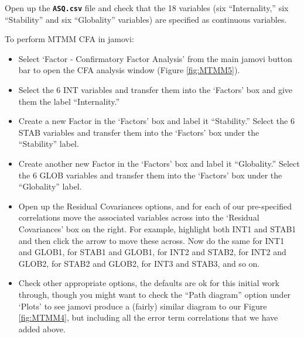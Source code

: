 \documentclass[
]{book}
\providecommand{\tightlist}{%
  \setlength{\itemsep}{0pt}\setlength{\parskip}{0pt}}
\begin{document}
Open up the \textbf{\texttt{ASQ.csv}} file and check that the 18 variables (six ``Internality,'' six ``Stability'' and six ``Globality'' variables) are specified as continuous variables.

To perform MTMM CFA in jamovi:

\begin{itemize}
\tightlist
\item
  Select `Factor - Confirmatory Factor Analysis' from the main jamovi button bar to open the CFA analysis window (Figure \ref{fig:MTMM5}).
\item
  Select the 6 INT variables and transfer them into the `Factors' box and give them the label ``Internality.''
\item
  Create a new Factor in the `Factors' box and label it ``Stability.'' Select the 6 STAB variables and transfer them into the `Factors' box under the ``Stability'' label.
\item
  Create another new Factor in the `Factors' box and label it ``Globality.'' Select the 6 GLOB variables and transfer them into the `Factors' box under the ``Globality'' label.
\item
  Open up the Residual Covariances options, and for each of our pre-specified correlations move the associated variables across into the `Residual Covariances' box on the right. For example, highlight both INT1 and STAB1 and then click the arrow to move these across. Now do the same for INT1 and GLOB1, for STAB1 and GLOB1, for INT2 and STAB2, for INT2 and GLOB2, for STAB2 and GLOB2, for INT3 and STAB3, and so on.
\item
  Check other appropriate options, the defaults are ok for this initial work through, though you might want to check the ``Path diagram'' option under `Plots' to see jamovi produce a (fairly) similar diagram to our Figure \ref{fig:MTMM4}, but including all the error term correlations that we have added above.
\end{itemize}
\end{document}
